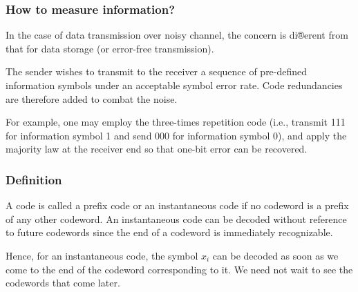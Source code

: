 \documentclass[a4]{beamer}
\begin{document}
\begin{frame}
\frametitle{How to measure information?}

In the case of data transmission over noisy channel, the concern is di®erent
from that for data storage (or error-free transmission). 


The sender wishes to
transmit to the receiver a sequence of pre-defined information symbols under an
acceptable symbol error rate. Code redundancies are therefore added to combat
the noise.

For example, one may employ the three-times repetition code (i.e.,
transmit 111 for information symbol 1 and send 000 for information symbol
0), and apply the majority law at the receiver end so that one-bit error can
be recovered.


\end{frame}
\begin{frame}

\frametitle{Definition} A code is called a prefix code or an instantaneous code if
no codeword is a prefix of any other codeword.
An instantaneous code can be decoded without reference to future codewords
since the end of a codeword is immediately recognizable. 

Hence,
for an instantaneous code, the symbol $x_i$ can be decoded as soon as we
come to the end of the codeword corresponding to it. We need not wait
to see the codewords that come later. 
\end{frame}
\end{document}
